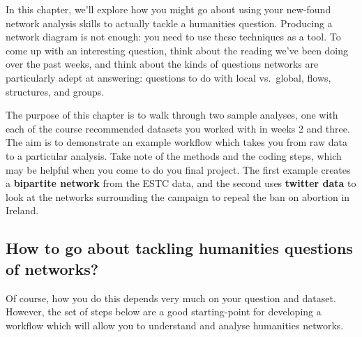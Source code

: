 \documentclass[
]{book}
\begin{document}
In this chapter, we'll explore how you might go about using your new-found network analysis skills to actually tackle a humanities question. Producing a network diagram is not enough: you need to use these techniques as a tool. To come up with an interesting question, think about the reading we've been doing over the past weeks, and think about the kinds of questions networks are particularly adept at answering: questions to do with local vs.~global, flows, structures, and groups.

The purpose of this chapter is to walk through two sample analyses, one with each of the course recommended datasets you worked with in weeks 2 and three. The aim is to demonstrate an example workflow which takes you from raw data to a particular analysis. Take note of the methods and the coding steps, which may be helpful when you come to do you final project. The first example creates a \textbf{bipartite network} from the ESTC data, and the second uses \textbf{twitter data} to look at the networks surrounding the campaign to repeal the ban on abortion in Ireland.

\hypertarget{how-to-go-about-tackling-humanities-questions-of-networks}{%
\subsection{How to go about tackling humanities questions of networks?}\label{how-to-go-about-tackling-humanities-questions-of-networks}}

Of course, how you do this depends very much on your question and dataset. However, the set of steps below are a good starting-point for developing a workflow which will allow you to understand and analyse humanities networks.
\end{document}

